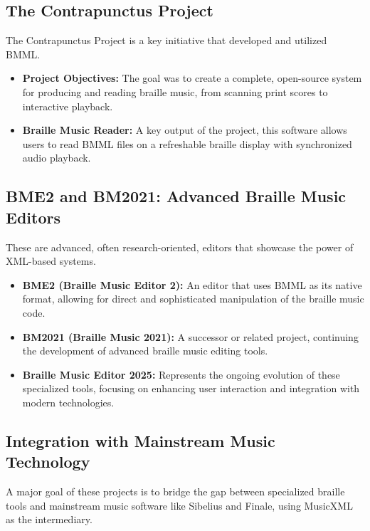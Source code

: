 \subsection{The Contrapunctus Project}\label{ch10:ssec:contrapunctus-project}
The Contrapunctus Project is a key initiative that developed and utilized \gls{BMML}.
\begin{itemize}
	\item \textbf{Project Objectives:} The goal was to create a complete, open-source system for producing and reading braille music, from scanning print scores to interactive playback.
	\item \textbf{Braille Music Reader:} A key output of the project, this software allows users to read \gls{BMML} files on a refreshable braille display with synchronized audio playback.
\end{itemize}

\subsection{BME2 and BM2021: Advanced Braille Music Editors}\label{ch10:ssec:bme2-bm2021}
These are advanced, often research-oriented, editors that showcase the power of \gls{XML}-based systems.
\begin{itemize}
	\item \textbf{BME2 (Braille Music Editor 2):} An editor that uses \gls{BMML} as its native format, allowing for direct and sophisticated manipulation of the braille music code.
	\item \textbf{BM2021 (Braille Music 2021):} A successor or related project, continuing the development of advanced braille music editing tools.
	\item \textbf{Braille Music Editor 2025:} Represents the ongoing evolution of these specialized tools, focusing on enhancing user interaction and integration with modern technologies.
\end{itemize}

\subsection{Integration with Mainstream Music Technology}\label{ch10:ssec:bmml-integration}
A major goal of these projects is to bridge the gap between specialized braille tools and mainstream music software like Sibelius and Finale, using \gls{MusicXML} as the intermediary.

